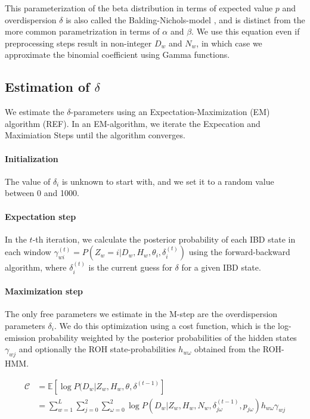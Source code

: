 \documentclass[12pt, letterpaper]{article}
\begin{document}
This parameterization of the beta distribution in terms of expected value $p$ and overdispersion $\delta$ is also called the Balding-Nichols-model \cite{balding_method_nodate}, and is distinct from the more common parametrization in terms of $\alpha$ and $\beta$. We use this equation even if preprocessing steps result in non-integer $D_w$ and $N_w$, in which case we approximate the binomial coefficient using Gamma functions.   

\subsection{Estimation of $\delta$}\label{delta}
We estimate the $\delta$-parameters using an Expectation-Maximization (EM) algorithm (REF). In an EM-algorithm, we iterate the Expecation and Maximiation Steps until the algorithm converges.

\paragraph{Initialization}
The value of $\delta_i$ is unknown to start with, and we set it to a random value between 0 and 1000.

\paragraph{Expectation step}
In the $t$-th iteration, we calculate the posterior probability of each IBD state in each window $\gamma^{(t)}_{wi} = P(Z_w=i | D_w, H_w, \theta_i, \delta_i^{(t)})$ using the forward-backward algorithm, where $\delta_i^{(t)}$ is the current guess for $\delta$ for a given IBD state.

\paragraph{Maximization step}
The only free parameters we estimate in the M-step are the overdispersion parameters $\delta_i$. We do this optimization using a cost function, which is the log-emission probability weighted by the posterior probabilities of the hidden states $\gamma_{wj}$ and optionally the ROH state-probabilities $h_{w\omega}$ obtained from the ROH-HMM.


\begin{align}\label{eq:4}
\mathcal{C} &= \mathbb{E}[\log P(D_w|Z_w, H_w, \theta, \delta^{(t-1)}]\nonumber\\
&= \sum_{w=1}^L \sum_{j=0}^2\sum^2_{\omega=0} \log P(D_{w}|Z_w, H_w, N_w, \delta_{j \omega}^{(t-1)}, p_{j \omega})h_{w\omega}\gamma_{wj}
\end{align}
\end{document}
